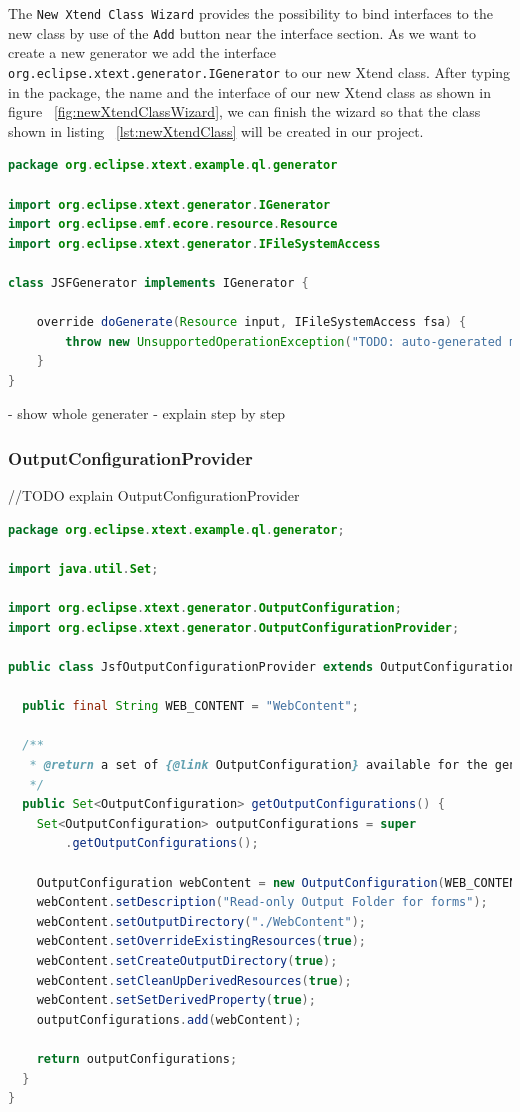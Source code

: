 The \texttt{New Xtend Class Wizard} provides the possibility to bind
interfaces to the new class by use of the \texttt{Add} button near the interface
section.
As we want to create a new generator we add the interface
\texttt{org.eclipse.xtext.generator.IGenerator} to our new Xtend class.
After typing in the package, the name and the interface of our new Xtend class
as shown in figure ~\ref{fig:newXtendClassWizard}, we can finish the
wizard so that the class shown in listing ~\ref{lst:newXtendClass} will be
created in our project.

\begin{lstlisting}[language=Java, caption={New Xtend
Class},label={lst:newXtendClass}] 
package org.eclipse.xtext.example.ql.generator

import org.eclipse.xtext.generator.IGenerator
import org.eclipse.emf.ecore.resource.Resource
import org.eclipse.xtext.generator.IFileSystemAccess

class JSFGenerator implements IGenerator {
	
	override doGenerate(Resource input, IFileSystemAccess fsa) {
		throw new UnsupportedOperationException("TODO: auto-generated method stub")
	}
}
\end{lstlisting}


- show whole generater
- explain step by step

\subsubsection{OutputConfigurationProvider}

//TODO explain OutputConfigurationProvider

\begin{lstlisting}[language=Java,
caption={JSFOutputConfigurationProvider},label={lst:jsfOutputConfigurationProvider}]
package org.eclipse.xtext.example.ql.generator;

import java.util.Set;

import org.eclipse.xtext.generator.OutputConfiguration;
import org.eclipse.xtext.generator.OutputConfigurationProvider;

public class JsfOutputConfigurationProvider extends OutputConfigurationProvider {

  public final String WEB_CONTENT = "WebContent";

  /**
   * @return a set of {@link OutputConfiguration} available for the generator
   */
  public Set<OutputConfiguration> getOutputConfigurations() {
    Set<OutputConfiguration> outputConfigurations = super
        .getOutputConfigurations();

    OutputConfiguration webContent = new OutputConfiguration(WEB_CONTENT);
    webContent.setDescription("Read-only Output Folder for forms");
    webContent.setOutputDirectory("./WebContent");
    webContent.setOverrideExistingResources(true);
    webContent.setCreateOutputDirectory(true);
    webContent.setCleanUpDerivedResources(true);
    webContent.setSetDerivedProperty(true);
    outputConfigurations.add(webContent);

    return outputConfigurations;
  }
}
\end{lstlisting}

